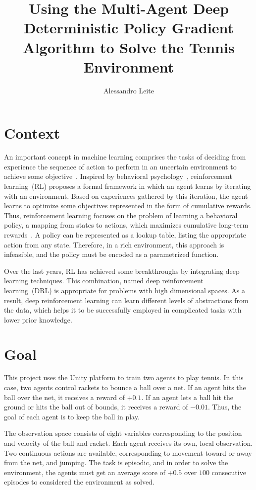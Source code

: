 \documentclass[12pt,english]{article}
\title{Using the Multi-Agent Deep Deterministic Policy Gradient Algorithm to Solve the Tennis Environment}
\author{Alessandro Leite}
\date{}
\begin{document}
\maketitle
\thispagestyle{plain}
\vspace{-60pt}

\section{Context}\label{sec:introduction}

An important concept in machine learning comprises the tasks of deciding from experience the sequence of action to perform in an uncertain environment to achieve some objective~\cite{francois:18}. Inspired by behavioral psychology~\cite{sutton:18}, reinforcement learning~(RL) proposes a formal framework in which an agent learns by iterating with an environment. Based on experiences gathered by this iteration, the agent learns to optimize some objectives represented in the form of cumulative rewards. Thus, reinforcement learning focuses on the problem of learning a behavioral policy, a mapping from states to actions, which maximizes cumulative long-term rewards~\cite{sutton:18}. A policy can be represented as a lookup table, listing the appropriate action from any state. Therefore, in a rich environment, this approach is infeasible, and the policy must be encoded as a parametrized function.

Over the last years, RL has achieved some breakthroughs by integrating deep learning techniques. This combination, named deep reinforcement learning~(DRL) is appropriate for problems with high dimensional spaces. As a result, deep reinforcement learning can learn different levels of abstractions from the data, which helps it to be successfully employed in complicated tasks with lower prior knowledge.   

\section{Goal}

This project uses the Unity platform to train two agents to play tennis. In this case, two agents control rackets to bounce a ball over a net. If an agent hits the ball over the net, it receives a reward of \(+0.1\). If an agent lets a ball hit the ground or hits the ball out of bounds, it receives a reward of \(-0.01\).  Thus, the goal of each agent is to keep the ball in play.

The observation space consists of eight variables corresponding to the position and velocity of the ball and racket. Each agent receives its own, local observation. Two continuous actions are available, corresponding to movement toward or away from the net, and jumping. The task is episodic, and in order to solve the environment, the agents must get an average score of \(+0.5\) over \(100\) consecutive episodes to considered the environment as solved. 
\end{document}
